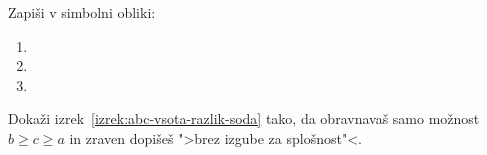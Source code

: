\begin{vaja}
  Zapiši v simbolni obliki:
  \begin{enumerate}
  \item {}
  \item {}
  \item {}
  \end{enumerate}
\end{vaja}

\begin{vaja}
  Dokaži izrek~\ref{izrek:abc-vsota-razlik-soda} tako, da obravnavaš
  samo možnost $b \geq c \geq a$ in zraven dopišeš ">brez izgube za
  splošnost"<.
\end{vaja}


